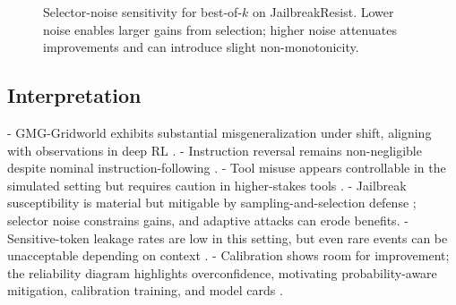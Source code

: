 \documentclass[11pt]{article}
\begin{document}
\begin{figure}[H]
\centering
{}
\caption{Selector-noise sensitivity for best-of-$k$ on JailbreakResist. Lower noise enables larger gains from selection; higher noise attenuates improvements and can introduce slight non-monotonicity.}
\label{fig:sigma}
\end{figure}

\subsection{Interpretation}
- GMG-Gridworld exhibits substantial misgeneralization under shift, aligning with observations in deep RL \citep{Shah2022GMG}. 
- Instruction reversal remains non-negligible despite nominal instruction-following \citep{Ouyang2022,Bai2022ConstitutionalAI}.
- Tool misuse appears controllable in the simulated setting but requires caution in higher-stakes tools \citep{Amodei2016Concrete}.
- Jailbreak susceptibility is material but mitigable by sampling-and-selection defense \citep{Perez2022RedTeam,Ganguli2022RTLM,Zou2023UniversalJailbreak}; selector noise constrains gains, and adaptive attacks can erode benefits.
- Sensitive-token leakage rates are low in this setting, but even rare events can be unacceptable depending on context \citep{Carlini2021Extraction,Greshake2023ReversePromptInjection}.
- Calibration shows room for improvement; the reliability diagram highlights overconfidence, motivating probability-aware mitigation, calibration training, and model cards \citep{Mitchell2019ModelCards,Liang2022HELM,Guo2017Calibration}.
\end{document}

